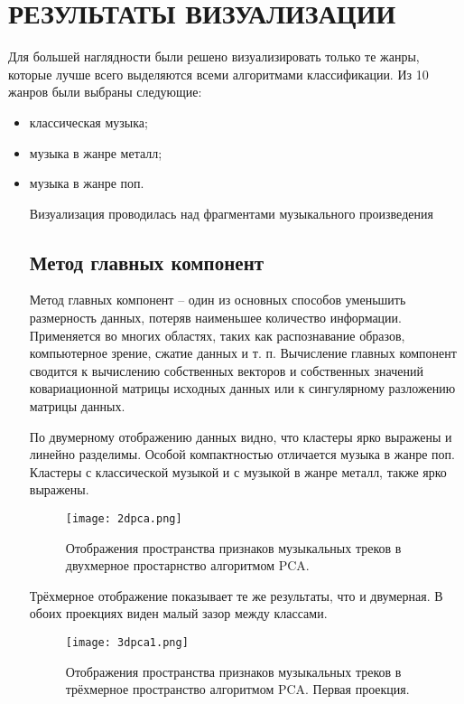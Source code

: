 \section{РЕЗУЛЬТАТЫ ВИЗУАЛИЗАЦИИ}
\label{sec:visualization}


Для большей наглядности были решено визуализировать только те жанры, которые лучше всего выделяются всеми алгоритмами классификации. Из 10 жанров были выбраны следующие:
\begin{itemize}
\item классическая музыка;
\item музыка в жанре металл;
\item музыка в жанре поп.
\begin{itemize}

Визуализация проводилась над фрагментами музыкального произведения

\subsection{Метод главных компонент} %
\label{sub:pca}
Метод главных компонент -- один из основных способов уменьшить размерность данных, потеряв наименьшее количество информации. Применяется во многих областях, таких как распознавание образов, компьютерное зрение, сжатие данных и т. п. Вычисление главных компонент сводится к вычислению собственных векторов и собственных значений ковариационной матрицы исходных данных или к сингулярному разложению матрицы данных. 



По двумерному отображению данных видно, что кластеры ярко выражены и линейно разделимы. Особой компактностью отличается музыка в жанре поп. Кластеры с классической музыкой и с музыкой в жанре металл, также ярко выражены.
\begin{figure}[h]
\centering
  \texttt{[image: 2dpca.png]}
  \caption{Отображения пространства  признаков музыкальных треков в двухмерное простарнство алгоритмом PCA.}
  \label{fig:results:2dtsne}
\end{figure}

Трёхмерное отображение показывает те же результаты, что и двумерная. В обоих проекциях виден малый зазор между классами.

\begin{figure}[h]
\centering
  \texttt{[image: 3dpca1.png]}
  \caption{Отображения пространства  признаков музыкальных треков в трёхмерное пространство алгоритмом PCA. Первая проекция. }
  \label{fig:results:2dtsne}
\end{figure}



\end{itemize}
\end{itemize}
